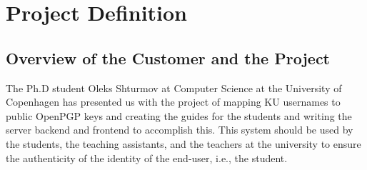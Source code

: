 \documentclass[11pt,a4paper]{article}
\begin{document}

\clearpage\maketitle
\thispagestyle{empty}

\newpage
\tableofcontents{}
\thispagestyle{empty}


\newpage


\section{Project Definition}
\subsection{Overview of the Customer and the Project}
The Ph.D student Oleks Shturmov at Computer Science at the University of Copenhagen has presented us with the project of mapping KU usernames to public OpenPGP keys and creating the guides for the students and writing the server backend and frontend to accomplish this. This system should be used by the students, the teaching assistants, and the teachers at the university to ensure the authenticity of the identity of the end-user, i.e., the student.
\end{document}
